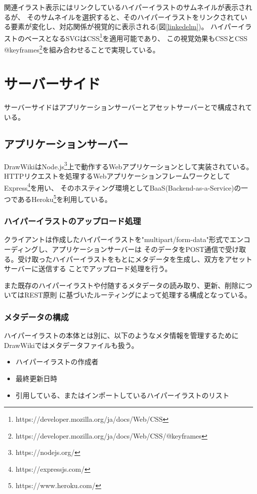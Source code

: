 関連イラスト表示にはリンクしているハイパーイラストのサムネイルが表示されるが、
そのサムネイルを選択すると、そのハイパーイラストをリンクされている要素が変化し、対応関係が視覚的に表示される(図\ref{linkedelm})。
ハイパーイラストのベースとなるSVGはCSS\footnote{https://developer.mozilla.org/ja/docs/Web/CSS}を適用可能であり、
この視覚効果もCSSとCSS @keyframes\footnote{https://developer.mozilla.org/ja/docs/Web/CSS/@keyframes}を組み合わせることで実現している。

\section{サーバーサイド}
サーバーサイドはアプリケーションサーバーとアセットサーバーとで構成されている。

\subsection{アプリケーションサーバー}
DrawWikiはNode.js\footnote{https://nodejs.org/}上で動作するWebアプリケーションとして実装されている。
HTTPリクエストを処理するWebアプリケーションフレームワークとしてExpress\footnote{https://expressjs.com/}を用い、
そのホスティング環境としてBaaS(Backend-as-a-Service)の一つであるHeroku\footnote{https://www.heroku.com/}を利用している。

\subsubsection{ハイパーイラストのアップロード処理}
クライアントは作成したハイパーイラストを"multipart/form-data"形式でエンコーディングし、アプリケーションサーバーは
そのデータをPOST通信で受け取る。受け取ったハイパーイラストをもとにメタデータを生成し、双方をアセットサーバーに送信する
ことでアップロード処理を行う。

また既存のハイパーイラストや付随するメタデータの読み取り、更新、削除についてはREST原則\cite{Fielding2000ArchitecturalSA}
に基づいたルーティングによって処理する構成となっている。

\subsubsection{メタデータの構成}
ハイパーイラストの本体とは別に、以下のようなメタ情報を管理するためにDrawWikiではメタデータファイルも扱う。
\begin{itemize}
    \item ハイパーイラストの作成者
    \item 最終更新日時
    \item 引用している、またはインポートしているハイパーイラストのリスト
\end{itemize}

